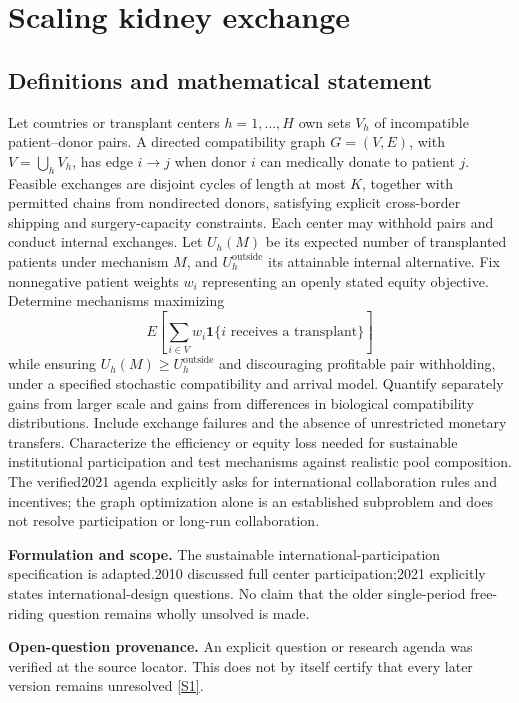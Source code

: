 \documentclass[11pt]{article}
\newcommand{\sref}[2]{\hyperlink{source:#1:#2}{[S#2]}}
\begin{document}
\section*{Scaling kidney exchange}\label{30007580}
\subsection{Definitions and mathematical statement}
Let countries or transplant centers \(h=1,\ldots,H\) own sets \(V_h\) of incompatible patient–donor pairs. A directed compatibility graph \(G=(V,E)\), with \(V=\bigcup_hV_h\), has edge \(i\to j\) when donor \(i\) can medically donate to patient \(j\). Feasible exchanges are disjoint cycles of length at most \(K\), together with permitted chains from nondirected donors, satisfying explicit cross-border shipping and surgery-capacity constraints. Each center may withhold pairs and conduct internal exchanges. Let \(U_h(M)\) be its expected number of transplanted patients under mechanism \(M\), and \(U_h^{\mathrm{outside}}\) its attainable internal alternative. Fix nonnegative patient weights \(w_i\) representing an openly stated equity objective. Determine mechanisms maximizing
\[
 E\left[\sum_{i\in V}w_i\mathbf1\{i\text{ receives a transplant}\}\right]
\]
while ensuring \(U_h(M)\geq U_h^{\mathrm{outside}}\) and discouraging profitable pair withholding, under a specified stochastic compatibility and arrival model. Quantify separately gains from larger scale and gains from differences in biological compatibility distributions. Include exchange failures and the absence of unrestricted monetary transfers. Characterize the efficiency or equity loss needed for sustainable institutional participation and test mechanisms against realistic pool composition. The verified2021 agenda explicitly asks for international collaboration rules and incentives; the graph optimization alone is an established subproblem and does not resolve participation or long-run collaboration.

\par\textbf{Formulation and scope.} The sustainable international-participation specification is adapted.2010 discussed full center participation;2021 explicitly states international-design questions. No claim that the older single-period free-riding question remains wholly unsolved is made.

\par\textbf{Open-question provenance.} An explicit question or research agenda was verified at the source locator. This does not by itself certify that every later version remains unresolved \sref{30007580}{1}.
\end{document}
